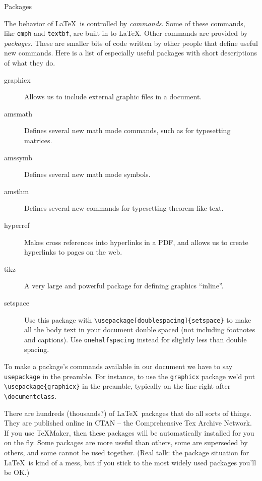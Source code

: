 \documentclass{article}
\begin{document}
\begin{center}
\Large Packages
\end{center}

The behavior of \LaTeX\ is controlled by \emph{commands}. Some of these commands, like \texttt{emph} and \texttt{textbf}, are built in to \LaTeX. Other commands are provided by \emph{packages}. These are smaller bits of code written by other people that define useful new commands. Here is a list of especially useful packages with short descriptions of what they do.

\begin{description}
\item[graphicx] Allows us to include external graphic files in a document.
\item[amsmath] Defines several new math mode commands, such as for typesetting matrices.
\item[amssymb] Defines several new math mode symbols.
\item[amsthm] Defines several new commands for typesetting theorem-like text.
\item[hyperref] Makes cross references into hyperlinks in a PDF, and allows us to create hyperlinks to pages on the web.
\item[tikz] A very large and powerful package for defining graphics ``inline''.
\item[setspace] Use this package with \verb|\usepackage[doublespacing]{setspace}| to make all the body text in your document double spaced (not including footnotes and captions). Use \texttt{onehalfspacing} instead for slightly less than double spacing.
\end{description}

To make a package's commands available in our document we have to say \texttt{usepackage} in the preamble. For instance, to use the \texttt{graphicx} package we'd put \verb|\usepackage{graphicx}| in the preamble, typically on the line right after \verb|\documentclass|.

There are hundreds (thousands?) of \LaTeX\ packages that do all sorts of things. They are published online in CTAN -- the Comprehensive Tex Archive Network. If you use \TeX{}Maker, then these packages will be automatically installed for you on the fly. Some packages are more useful than others, some are superseded by others, and some cannot be used together. (Real talk: the package situation for \LaTeX\ is kind of a mess, but if you stick to the most widely used packages you'll be OK.)
\end{document}
